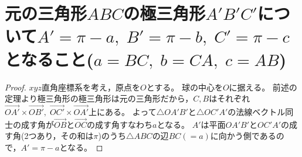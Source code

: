     \section{元の三角形\texorpdfstring{$ABC$}{ABC}の極三角形\texorpdfstring{$A'B'C'$}{A'B'C'}について\texorpdfstring{$A'=\pi-a,\;B'=\pi-b,\;C'=\pi-c$}{A'=π-a, B'=π-b, C'=π-c}となること(\texorpdfstring{$a=BC,\;b=CA,\;c=AB$}{a=BC, b=CA, c=AB})}
        \begin{proof}
            \quad\par
            $xyz$直角座標系を考え，原点を$O$とする。
            球の中心を$O$に据える。
            前述の定理より極三角形の極三角形は元の三角形だから，$C,B$はそれぞれ$\overrightarrow{OA'}\times\overrightarrow{OB'},\;\overrightarrow{OC'}\times\overrightarrow{OA'}$上にある。
            よって$\triangle OA'B'$と$\triangle OC'A'$の法線ベクトル同士の成す角が$\overrightarrow{OB}$と$\overrightarrow{OC}$の成す角すなわち$a$となる。
            $A'$は平面$OA'B'$と$OC'A'$の成す角(2つあり，その和は$\pi$)のうち$\triangle ABC$の辺$BC(=a)$に向かう側であるので，$A' = \pi-a$となる。
        \end{proof}